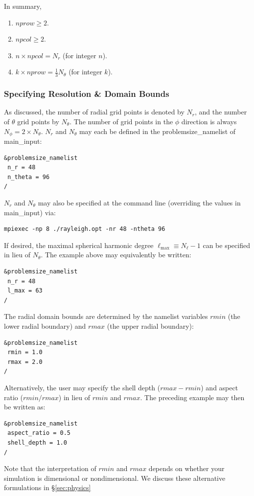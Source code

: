 In summary,
\begin{enumerate}
\item $nprow \ge 2$.
\item $npcol \ge 2$.
\item $n \times npcol = N_r$ (for integer $n$).
\item $k \times nprow = \frac{1}{3}N_\theta$ (for integer $k$).
\end{enumerate}

\subsubsection{Specifying Resolution \& Domain Bounds}
As discussed, the number of radial grid points is denoted by $N_r$, and the number of $\theta$ grid points by $N_\theta$.  The number of grid points in the $\phi$ direction is always $N_\phi=2\times N_\theta$.  $N_r$ and $N_\theta$ may each be defined in the problemsize\_namelist of main\_input:
\begin{lstlisting}
&problemsize_namelist
 n_r = 48
 n_theta = 96
/
\end{lstlisting}
$N_r$ and $N_\theta$ may also be specified at the command line (overriding the values in main\_input) via:
\begin{lstlisting}
mpiexec -np 8 ./rayleigh.opt -nr 48 -ntheta 96
\end{lstlisting}

If desired, the maximal spherical harmonic degree $\ell_\mathrm{max}\equiv N_\ell-1$ can be specified in lieu of $N_\theta$.  The example above may equivalently be written:
\begin{lstlisting}
&problemsize_namelist
 n_r = 48
 l_max = 63
/
\end{lstlisting}

The radial domain bounds are determined by the namelist variables $rmin$ (the lower radial boundary) and $rmax$ (the upper radial boundary):
\begin{lstlisting}
&problemsize_namelist
 rmin = 1.0
 rmax = 2.0
/
\end{lstlisting}

Alternatively, the user may specify the shell depth ($rmax-rmin$) and aspect ratio ($rmin/rmax$) in lieu of $rmin$ and $rmax$.  The preceding example may then be written as:
\begin{lstlisting}
&problemsize_namelist
 aspect_ratio = 0.5
 shell_depth = 1.0
/
\end{lstlisting}

Note that the interpretation of $rmin$ and $rmax$ depends on whether your simulation is dimensional or nondimensional.  We discuss these alternative formulations in \S \ref{sec:physics}


